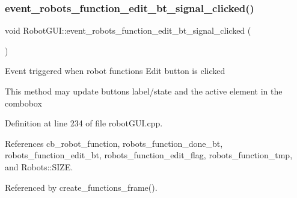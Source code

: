 \subsubsection{\texorpdfstring{event\+\_\+robots\+\_\+function\+\_\+edit\+\_\+bt\+\_\+signal\+\_\+clicked()}{event\_robots\_function\_edit\_bt\_signal\_clicked()}}
{\footnotesize\ttfamily void Robot\+G\+U\+I\+::event\+\_\+robots\+\_\+function\+\_\+edit\+\_\+bt\+\_\+signal\+\_\+clicked (\begin{DoxyParamCaption}{ }\end{DoxyParamCaption})\hspace{0.3cm}{\ttfamily [private]}}

Event triggered when robot function\textquotesingle{}s Edit button is clicked

This method may update buttons\textquotesingle{} label/state and the active element in the combobox 

Definition at line 234 of file robot\+G\+U\+I.\+cpp.



References cb\+\_\+robot\+\_\+function, robots\+\_\+function\+\_\+done\+\_\+bt, robots\+\_\+function\+\_\+edit\+\_\+bt, robots\+\_\+function\+\_\+edit\+\_\+flag, robots\+\_\+function\+\_\+tmp, and Robots\+::\+S\+I\+ZE.



Referenced by create\+\_\+functions\+\_\+frame().


